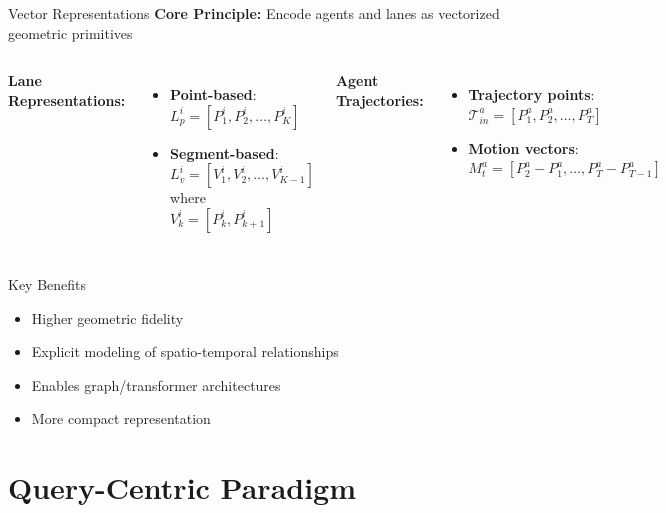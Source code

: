 \documentclass[10pt,aspectratio=169]{beamer}
\begin{document}
\begin{frame}{Vector Representations}
\textbf{Core Principle:} Encode agents and lanes as vectorized geometric primitives

\vspace{0.3cm}

\begin{columns}[T]
\textbf{Lane Representations:}
\begin{itemize}
    \item \textbf{Point-based}: $L_p^i = [P_1^i, P_2^i, \ldots, P_K^i]$
    \item \textbf{Segment-based}: $L_v^i = [V_1^i, V_2^i, \ldots, V_{K-1}^i]$ where $V_{k}^i = [P_k^i, P_{k+1}^i]$
\end{itemize}

\textbf{Agent Trajectories:}
\begin{itemize}
    \item \textbf{Trajectory points}: $\mathcal{T}_{in}^a = [P_1^a, P_2^a, \ldots, P_T^a]$
    \item \textbf{Motion vectors}: $M_t^a = [P_{2}^a - P_{1}^a, \ldots, P_{T}^a - P_{T-1}^a]$
\end{itemize}
\end{columns}

\vspace{0.3cm}

\begin{block}{Key Benefits}
\begin{itemize}
    \item Higher geometric fidelity
    \item Explicit modeling of spatio-temporal relationships
    \item Enables graph/transformer architectures
    \item More compact representation
\end{itemize}
\end{block}
\end{frame}

\section{Query-Centric Paradigm}
\end{document}
